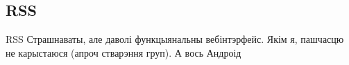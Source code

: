 \documentclass[ignorenonframetext,hyperref={pdftex,unicode}]{beamer}
\begin{document}
\subsection{RSS}
\begin{frame}{RSS}
	Страшнаваты, але даволі функцыянальны вебінтэрфейс. Якім я, пашчасцю не карыстаюся (апроч стварэння груп). А вось Андроід
\end{frame}
\end{document}
